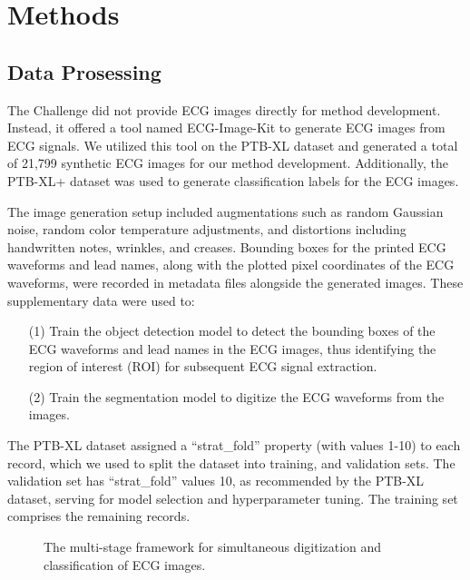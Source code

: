 \section{Methods}
\label{sec:methods}


\subsection{Data Prosessing}
\label{subsec:data_processing}


The Challenge did not provide ECG images directly for method development. Instead, it offered a tool named ECG-Image-Kit \cite{Shivashankara_2024_ECG} to generate ECG images from ECG signals. We utilized this tool on the PTB-XL dataset \cite{wagner2020ptb_xl} and generated a total of 21,799 synthetic ECG images for our method development. Additionally, the PTB-XL+ dataset \cite{Strodthoff_2023} was used to generate classification labels for the ECG images.

The image generation setup included augmentations such as random Gaussian noise, random color temperature adjustments, and distortions including handwritten notes, wrinkles, and creases. Bounding boxes for the printed ECG waveforms and lead names, along with the plotted pixel coordinates of the ECG waveforms, were recorded in metadata files alongside the generated images. These supplementary data were used to:
\begin{itemize}
\item[(1)] Train the object detection model to detect the bounding boxes of the ECG waveforms and lead names in the ECG images, thus identifying the region of interest (ROI) for subsequent ECG signal extraction.
\item[(2)] Train the segmentation model to digitize the ECG waveforms from the images.
\end{itemize}

The PTB-XL dataset assigned a ``strat\_fold'' property (with values 1-10) to each record, which we used to split the dataset into training, and validation sets. The validation set has ``strat\_fold'' values 10, as recommended by the PTB-XL dataset, serving for model selection and hyperparameter tuning. The training set comprises the remaining records.

\newif\ifFrameworkFigBox
\FrameworkFigBoxtrue

\begin{figure}[!ht]
\centering

\caption{The multi-stage framework for simultaneous digitization and classification of ECG images.}
\label{fig:multi-stage-framework}
\end{figure}

